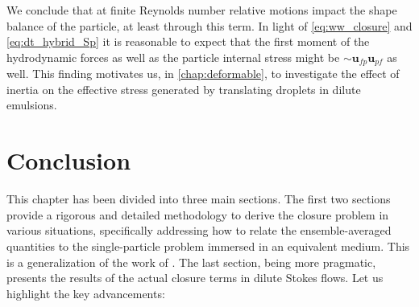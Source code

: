 We conclude that at finite Reynolds number relative motions impact the shape balance of the particle, at least through this term. 
In light of \ref{eq:ww_closure} and \ref{eq:dt_hybrid_Sp} it is reasonable to expect that the first moment of the hydrodynamic forces as well as the particle internal stress might be $\sim \textbf{u}_{fp}\textbf{u}_{pf} $ as well. 
This finding motivates us, in \ref{chap:deformable}, to investigate the effect of inertia on the effective stress generated by translating droplets in dilute emulsions.


\section{Conclusion}
This chapter has been divided into three main sections. 
The first two sections provide a rigorous and detailed methodology to derive the closure problem in various situations, specifically addressing how to relate the ensemble-averaged quantities to the single-particle problem immersed in an equivalent medium. 
This is a generalization of the work of \citet{hinch1977averaged}. 
The last section, being more pragmatic, presents the results of the actual closure terms in dilute Stokes flows. 
Let us highlight the key advancements:
